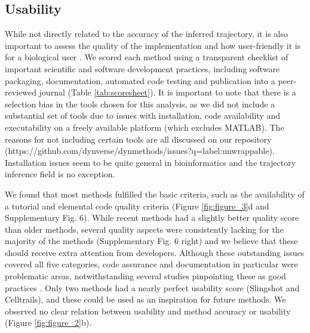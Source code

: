 \subsection{Usability}

While not directly related to the accuracy of the inferred trajectory, it is also important to assess the quality of the implementation and how user-friendly it is for a biological user \cite{taschuk_tensimplerules_2017}. We scored each method using a transparent checklist of important scientific and software development practices, including software packaging, documentation, automated code testing and publication into a peer-reviewed journal (Table \ref{tab:scoresheet}). It is important to note that there is a selection bias in the tools chosen for this analysis, as we did not include a substantial set of tools due to issues with installation, code availability and executability on a freely available platform (which excludes MATLAB). The reasons for not including certain tools are all discussed on our repository (https://github.com/dynverse/dynmethods/issues?q=label:unwrappable). Installation issues seem to be quite general in bioinformatics \cite{mangul_comprehensiveanalysisusability_2018} and the trajectory inference field is no exception.

We found that most methods fulfilled the basic criteria, such as the availability of a tutorial and elemental code quality criteria (Figure \ref{fig:figure_3}d and Supplementary Fig. 6). While recent methods had a slightly better quality score than older methods, several quality aspects were consistently lacking for the majority of the methods (Supplementary Fig. 6 right) and we believe that these should receive extra attention from developers. Although these outstanding issues covered all five categories, code assurance and documentation in particular were problematic areas, notwithstanding several studies pinpointing these as good practices \cite{wilson_bestpracticesscientific_2014,artaza_top10metrics_2016}. Only two methods had a nearly perfect usability score (Slingshot and Celltrails), and these could be used as an inspiration for future methods. We observed no clear relation between usability and method accuracy or usability (Figure \ref{fig:figure_2}b).



